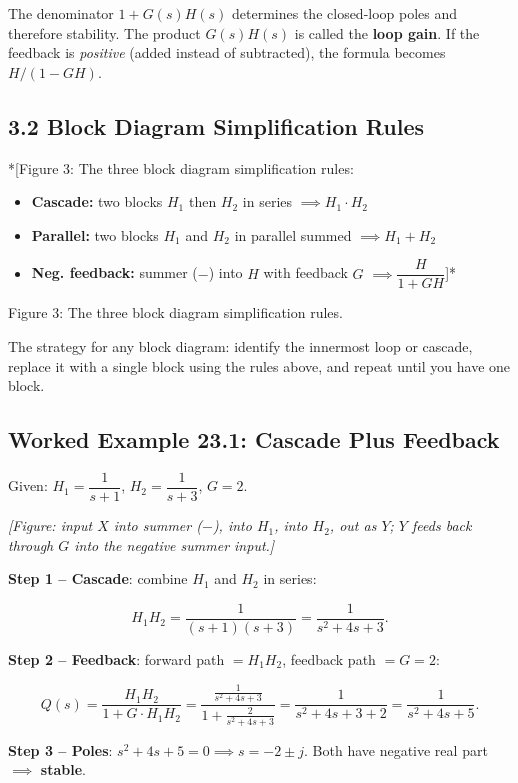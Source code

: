 \documentclass[11pt]{article}
\begin{document}
The denominator $1 + G(s)H(s)$ determines the closed-loop poles and therefore stability. The product $G(s)H(s)$ is called the \textbf{loop gain}. If the feedback is \textit{positive} (added instead of subtracted), the formula becomes $H/(1 - GH)$.

\subsection*{3.2 Block Diagram Simplification Rules}

*[Figure 3: The three block diagram simplification rules:
\begin{itemize}
  \item \textbf{Cascade:} two blocks $H_1$ then $H_2$ in series $\implies H_1 \cdot H_2$
  \item \textbf{Parallel:} two blocks $H_1$ and $H_2$ in parallel summed $\implies H_1 + H_2$
  \item \textbf{Neg. feedback:} summer ($-$) into $H$ with feedback $G$ $\implies \dfrac{H}{1 + GH}$]*
\end{itemize}

Figure 3: The three block diagram simplification rules.

The strategy for any block diagram: identify the innermost loop or cascade, replace it with a single block using the rules above, and repeat until you have one block.

\subsection*{Worked Example 23.1: Cascade Plus Feedback}

Given: $H_1 = \dfrac{1}{s+1}$, $H_2 = \dfrac{1}{s+3}$, $G = 2$.

\textit{[Figure: input $X$ into summer ($-$), into $H_1$, into $H_2$, out as $Y$; $Y$ feeds back through $G$ into the negative summer input.]}

\textbf{Step 1 – Cascade}: combine $H_1$ and $H_2$ in series:

\[H_1 H_2 = \frac{1}{(s+1)(s+3)} = \frac{1}{s^2 + 4s + 3}.\]

\textbf{Step 2 – Feedback}: forward path $= H_1 H_2$, feedback path $= G = 2$:

\[Q(s) = \frac{H_1 H_2}{1 + G \cdot H_1 H_2} = \frac{\frac{1}{s^2+4s+3}}{1 + \frac{2}{s^2+4s+3}} = \frac{1}{s^2 + 4s + 3 + 2} = \frac{1}{s^2 + 4s + 5}.\]

\textbf{Step 3 – Poles}: $s^2 + 4s + 5 = 0 \implies s = -2 \pm j$. Both have negative real part $\implies$ \textbf{stable}.
\end{document}
